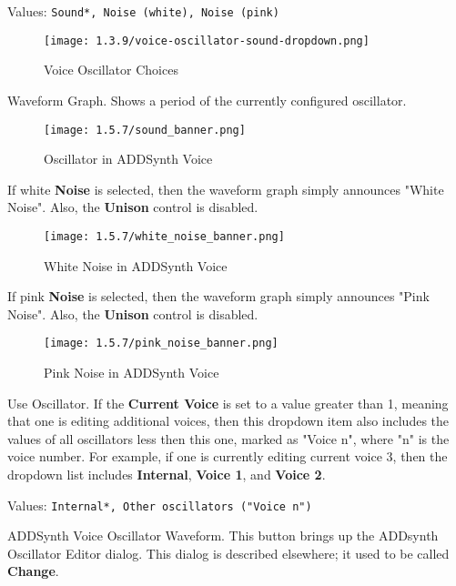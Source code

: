    Values: \texttt{Sound*, Noise (white), Noise (pink)}

\begin{figure}[H]
   \centering
   \texttt{[image: 1.3.9/voice-oscillator-sound-dropdown.png]}
   \caption{Voice Oscillator Choices}
   \label{fig:voice_oscillator_choices}
\end{figure}

   Waveform Graph.
   Shows a period of the currently configured oscillator.

\begin{figure}[H]
   \centering
   \texttt{[image: 1.5.7/sound\_banner.png]}
   \caption{Oscillator in ADDSynth Voice}
   \label{fig:voice_oscillator_oscillator}
\end{figure}

   If white \textbf{Noise} is selected, then the waveform graph simply announces
   "White Noise".  Also, the \textbf{Unison} control is
   disabled.

\begin{figure}[H]
   \centering
   \texttt{[image: 1.5.7/white\_noise\_banner.png]}
   \caption{White Noise in ADDSynth Voice}
   \label{fig:voice_oscillator_white_noise}
\end{figure}

   If pink \textbf{Noise} is selected, then the waveform graph simply announces
   "Pink Noise".  Also, the \textbf{Unison} control is
   disabled.

\begin{figure}[H]
   \centering
   \texttt{[image: 1.5.7/pink\_noise\_banner.png]}
   \caption{Pink Noise in ADDSynth Voice}
   \label{fig:voice_oscillator_pink_noise}
\end{figure}

   Use Oscillator.
   If the \textbf{Current Voice} is set to a value greater than 1, meaning
   that one is editing additional voices, then this dropdown item also
   includes the values of all oscillators less then this one, marked as
   "Voice n", where "n" is the voice number.
   For example, if one is currently editing current voice 3,
   then the dropdown list includes \textbf{Internal}, \textbf{Voice 1}, and
   \textbf{Voice 2}.

   Values: \texttt{Internal*, Other oscillators ("Voice n")}

   ADDSynth Voice Oscillator Waveform.
   This button brings up the ADDsynth Oscillator Editor dialog.
   This dialog is described elsewhere; it used to be called
   \textbf{Change}.

